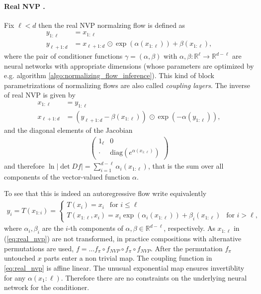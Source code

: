 \documentclass[12pt,a4paper]{article}
\begin{document}
\paragraph{Real NVP \cite{dinh_2016_real_nvp}.} Fix $\ell < d$ then the real NVP normalzing flow is defined as
\begin{align} \label{eq:real_nvp}
	y_{1:\ell} &= x_{1:\ell} \nonumber \\
	y_{\ell+1:d} &= x_{\ell + 1 : d}\, \odot \exp(\alpha(x_{1:\ell})) + \beta(x_{1:\ell}), 
\end{align}
where the pair of conditioner functions $\gamma=(\alpha,\beta)$ with $\alpha, \beta: \mathbb{R}^\ell \rightarrow \mathbb{R}^{d - \ell} $ are neural networks with appropriate dimensions (whose parameters are optimized by e.g. algorithm \ref{algo:normalizing_flow_inference}). This kind of block parametrizations of normalizing flows are also called \textit{coupling layers}. 
The inverse of real NVP is given by
\begin{align} \label{eq:real_nvp}
x_{1:\ell} &= y_{1:\ell} \nonumber \\
x_{\ell+1:d} &= \left(y_{\ell + 1 : d}-  \beta(x_{1:\ell}) \right)\, \odot \exp(-\alpha(y_{1:\ell})), 
\end{align}
and the diagonal elements of the Jacobian 
\begin{align}
\begin{pmatrix}
1_\ell & 0 \\
\cdot & \text{diag} \left(e^{\alpha(x_{1:\ell})}\right)
\end{pmatrix}
\end{align}
and therefore $\ln |\det Df| = \sum_{i=1}^{d-\ell}  \alpha_i(x_{1:\ell})$, that is the sum over all components of the vector-valued function $\alpha$.

To see that this is indeed an  autoregressive flow write equivalently
\begin{align}
	y_i = T(x_{1:i}) = \begin{cases}
	T(x_i) = x_i  ~~ \text{ for } i\leq \ell\\ 
	T(x_{1:\ell}, x_i) =  x_i \exp(\alpha_i(x_{1:\ell})) + \beta_i(x_{1:\ell}) ~~ \text{ for } i > \ell,
	\end{cases}
\end{align}
where $\alpha_i, \beta_i$ are the $i$-th components of $\alpha, \beta \in \mathbb{R}^{d-\ell}$, respectively.
As $x_{1:\ell}$ in (\ref{eq:real_nvp}) are not transformed, in practice compositions with alternative permutations are used, $f = \dots f_\pi \circ  f_{NVP} \circ f_\pi \circ f_{NVP} $. After the permutation $f_\pi$ untouched $x$ parts enter a non trivial map. The coupling function in \ref{eq:real_nvp} is affine linear. The unusual exponential map ensures invertiblity for any $\alpha(x_1:\ell)$. Therefore there are no constraints on the underlying neural network for the conditioner. 
\end{document}
